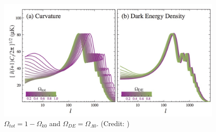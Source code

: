 \documentclass{article}
\begin{document}
\begin{figure}
\begin{center}
\includegraphics[width=\textwidth]{curvature_de}
\end{center}
\caption{$\Omega_{tot} = 1-\Omega_{k0}$ and $\Omega_{DE} = \Omega_{\Lambda 0}$. (Credit: \cite{huCosmicMicrowaveBackground2001})}
\label{DE_curv}
\end{figure}
\end{document}
